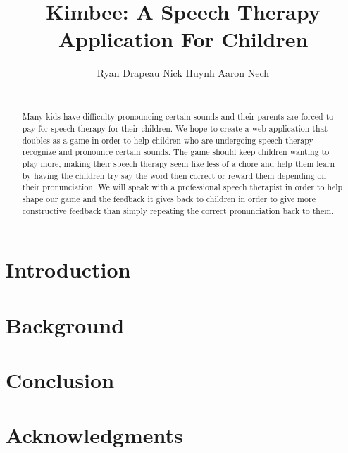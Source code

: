 \documentclass{sig-alternate-2013}
\begin{document}
\title{Kimbee: A Speech Therapy Application For Children}

\author{
    \alignauthor
    \vspace*{-0.3in}
        Ryan Drapeau \hspace{3.0cm}
        Nick Huynh \hspace{3.0cm}
        Aaron Nech \\
     \\[7 pt]
}

\maketitle

\begin{abstract}

Many kids have difficulty pronouncing certain sounds and their parents are forced to pay for speech therapy for their children. We hope to create a web application that doubles as a game in order to help children who are undergoing speech therapy recognize and pronounce certain sounds. The game should keep children wanting to play more, making their speech therapy seem like less of a chore and help them learn by having the children try say the word then correct or reward them depending on their pronunciation. We will speak with a professional speech therapist in order to help shape our game and the feedback it gives back to children in order to give more constructive feedback than simply repeating the correct pronunciation back to them.

\end{abstract}


\section{Introduction}

\section{Background}

\section{Conclusion}

\section{Acknowledgments}




\balancecolumns
\end{document}
